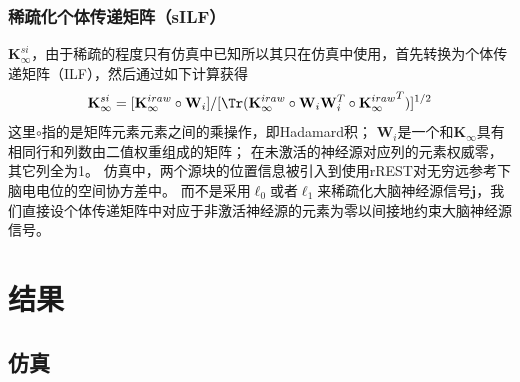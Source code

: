 \subsubsection{稀疏化个体传递矩阵（sILF）}
$\mathbf{K}_{\infty}^{si}$，由于稀疏的程度只有仿真中已知所以其只在仿真中使用，首先转换为个体传递矩阵（ILF），然后通过如下计算获得
\begin{equation*}
\mathbf{K}_{\infty}^{si}=[\mathbf{K}_{\infty}^{iraw}\circ\mathbf{W}_i]/{[\Tr(\mathbf{K}_{\infty}^{iraw}\circ\mathbf{W}_i\mathbf{W}_i^T\circ{\mathbf{K}_{\infty}^{iraw}}^T)]^{1/2}}
\end{equation*}
这里$\circ$指的是矩阵元素元素之间的乘操作，即Hadamard积； $\mathbf{W}_i$是一个和$\mathbf{K}_{\infty}$具有相同行和列数由二值权重组成的矩阵； 在未激活的神经源对应列的元素权威零，其它列全为1。 仿真中，两个源块的位置信息被引入到使用rREST对无穷远参考下脑电电位的空间协方差中。 而不是采用$\ell_0$或者$\ell_1$来稀疏化大脑神经源信号$\mathbf{j}$，我们直接设个体传递矩阵中对应于非激活神经源的元素为零以间接地约束大脑神经源信号。

\section{结果}
\subsection{仿真}
